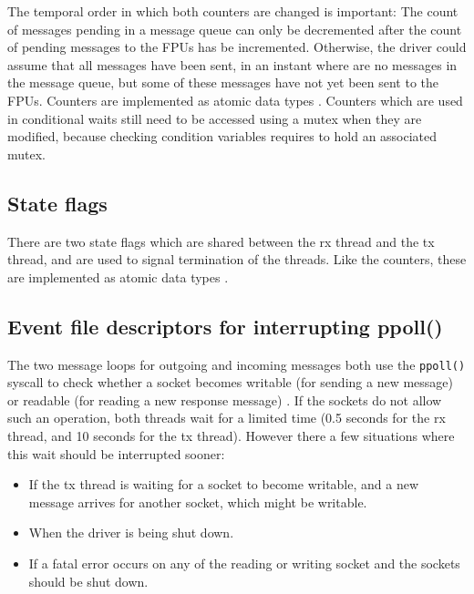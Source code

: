 \documentclass[fontsize=12,a4paper]{scrartcl}
\begin{document}
The temporal order in which both counters are changed is important:
The count of messages pending in a message queue can only be
decremented after the count of pending messages to the FPUs has be
incremented. Otherwise, the driver could assume that all messages have
been sent, in an instant where are no messages in the message queue,
but some of these messages have not yet been sent to the FPUs.
Counters are implemented as atomic data types \cite[see chapter
  5]{Williams:CppConcurrency}. Counters which are used in conditional
waits still need to be accessed using a mutex when they are modified,
because checking condition variables requires to hold an associated
mutex.



\subsection{State flags}

There are two state flags which are shared between the rx thread and
the tx thread, and are used to signal termination of the threads. Like
the counters, these are implemented as atomic data types \cite[see chapter 5]{Williams:CppConcurrency}.

\subsection{Event file descriptors for interrupting ppoll()}

The two message loops for outgoing and incoming messages both use the
\texttt{ppoll()} syscall to check whether a socket becomes writable
(for sending a new message) or readable (for reading a new response
message) \cite[p. 51, p61]{Love:2013:LSP}. If the sockets do not allow
such an operation, both threads wait for a limited time (0.5 seconds
for the rx thread, and 10 seconds for the tx thread). However there a
few situations where this wait should be interrupted sooner:

\begin{itemize}
\item If the tx thread is waiting for a socket to become
  writable, and a new message arrives for another socket,
  which might be writable.
\item When the driver is being shut down.
\item If a fatal error occurs on any of the reading or writing socket
  and the sockets should be shut down.
\end{itemize}
\end{document}
